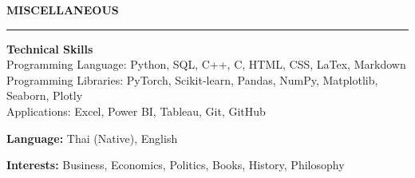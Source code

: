\documentclass[11pt]{article}
\begin{document}




\vspace{9pt}
\textbf{MISCELLANEOUS}
\vspace{5pt}
{\color{NavyBlue}\hrule}
\vspace{6pt}

\textbf{Technical Skills}\\
\hspace*{7pt} Programming Language: Python, SQL, C++, C, HTML, CSS, LaTex, Markdown\\
\hspace*{7pt} Programming Libraries: PyTorch, Scikit-learn, Pandas, NumPy, Matplotlib, Seaborn, Plotly\\
\hspace*{7pt} Applications: Excel, Power BI, Tableau, Git, GitHub

\textbf{Language:} Thai (Native), English

\textbf{Interests:} Business, Economics, Politics, Books, History, Philosophy
\end{document}
